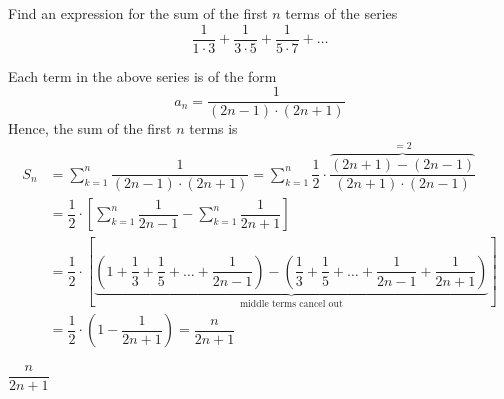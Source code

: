 

\question[3] Find an expression for the sum of the first $n$ terms of the series 
\[ \dfrac{1}{1\cdot 3} + \dfrac{1}{3\cdot 5} + \dfrac{1}{5\cdot 7} + \ldots \]

\begin{solution}[\halfpage]
	Each term in the above series is of the form 
	\[ a_n = \dfrac{1}{(2n-1)\cdot(2n+1)} \] 
	Hence, the sum of the first $n$ terms is
	\begin{align}
		S_n &= \sum_{k=1}^{n}\dfrac{1}{(2n-1)\cdot(2n+1)} = 
		\sum_{k=1}^{n}\dfrac{1}{2}\cdot\dfrac{\overbrace{(2n+1)-(2n-1)}^{=2}}{(2n+1)\cdot(2n-1)} \\
		&= \dfrac{1}{2}\cdot\left[ \sum_{k=1}^{n}\dfrac{1}{2n-1} - \sum_{k=1}^{n}\dfrac{1}{2n+1}\right] \\
		&= \dfrac{1}{2}\cdot\left[ \underbrace{\left( 1 + \dfrac{1}{3} + \dfrac{1}{5} + \ldots + \dfrac{1}{2n-1}\right)
		 - \left( \dfrac{1}{3} + \dfrac{1}{5} + \ldots + \dfrac{1}{2n-1} + \dfrac{1}{2n+1} \right)}
		 _{\text{middle terms cancel out}}\right] \\
		 &= \dfrac{1}{2}\cdot\left( 1-\dfrac{1}{2n+1}\right) = \dfrac{n}{2n+1}
	\end{align}
\end{solution}
\ifprintanswers\begin{codex}$\dfrac{n}{2n+1}$\end{codex}\fi

